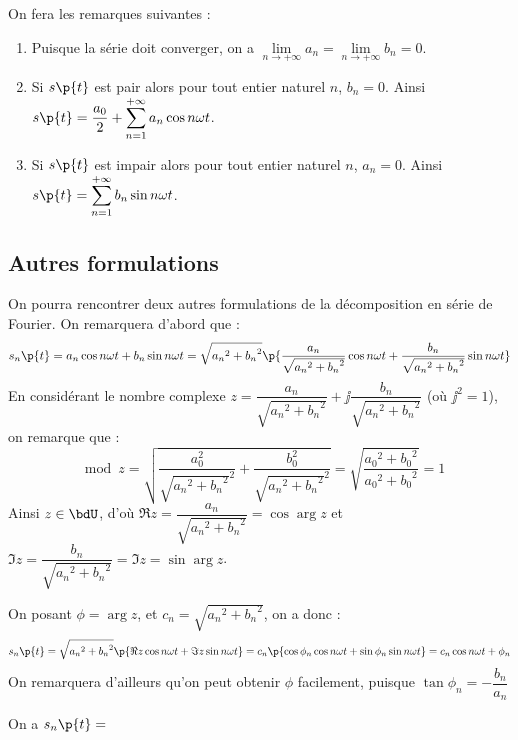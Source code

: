     On fera les remarques suivantes :
    \begin{enumerate}
        \item Puisque la série doit converger, on a $\lim\limits_{n \to +\infty} a_n = \lim\limits_{n \to +\infty} b_n = 0$.
        
        \item Si $s\p{t}$ est pair alors pour tout entier naturel $n$, $b_n = 0$. Ainsi $s\p{t} = \dfrac{a_0}{2} + \displaystyle\sum_{n=1}^{+\infty} a_n\cos{n\omega t}$.
        
        \item Si $s\p{t}$ est impair alors pour tout entier naturel $n$, $a_n = 0$. Ainsi $s\p{t} = \displaystyle\sum_{n=1}^{+\infty} b_n\sin{n\omega t}$.
    \end{enumerate}
    
    \subsection{Autres formulations}
    
    On pourra rencontrer deux autres formulations de la décomposition en série de Fourier. On remarquera d'abord que :
    \[ s_n\p{t} = a_n\cos{n\omega t} + b_n\sin{n\omega t} = \sqrt{{a_n}^2 + {b_n}^2}\p{\dfrac{a_n}{\sqrt{{a_n}^2 + {b_n}^2}}\cos{n\omega t} + \dfrac{b_n}{\sqrt{{a_n}^2 + {b_n}^2}}\sin{n\omega t}}\]
    En considérant le nombre complexe $z = \dfrac{a_n}{\sqrt{{a_n}^2 + {b_n}^2}} + \jj\dfrac{b_n}{\sqrt{{a_n}^2 + {b_n}^2}}$ (où $\jj^2 = 1$), on remarque que :
    \[ \mod{z} = \sqrt{\dfrac{a_0^2}{\sqrt{{a_n}^2 + {b_n}^2}^2} + \dfrac{b_0^2}{\sqrt{{a_n}^2 + {b_n}^2}^2}} = \sqrt{\dfrac{{a_0}^2 + {b_0}^2}{{a_0}^2 + {b_0}^2}} = 1\]
    Ainsi $z \in \bdU$, d'où $\Re{z} = \dfrac{a_n}{\sqrt{{a_n}^2 + {b_n}^2}} = \cos{\arg z}$ et $\Im{z} = \dfrac{b_n}{\sqrt{{a_n}^2 + {b_n}^2}} = \Im{z} = \sin{\arg z}$.
    
    On posant $\phi = \arg z$, et $c_n = \sqrt{{a_n}^2 + {b_n}^2}$, on a donc :
    \[ s_n\p{t} = \sqrt{{a_n}^2 + {b_n}^2} \p{\Re{z}\cos{n\omega t} + \Im{z}\sin{n \omega t}} = c_n\p{\cos{\phi_n}\cos{n\omega t} + \sin{\phi_n}\sin{n\omega t}} = c_n\cos{n\omega t + \phi_n}\]
    On remarquera d'ailleurs qu'on peut obtenir $\phi$ facilement, puisque $\tan \phi_n = -\dfrac{b_n}{a_n}$
    \begin{enumerate}
        \itt On a $s_n\p{t} =$
    \end{enumerate}
    
